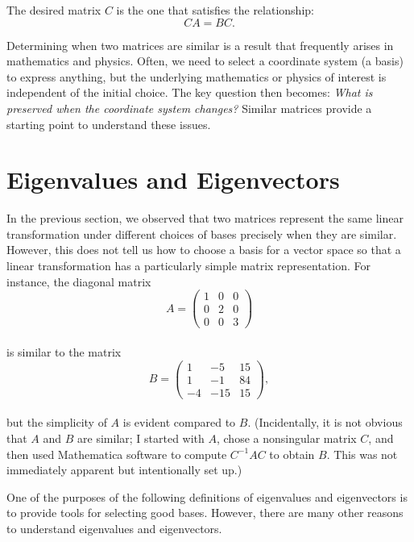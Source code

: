 \documentclass[
]{book}
\theoremstyle{definition}
\theoremstyle{definition}
\theoremstyle{definition}
\theoremstyle{definition}
\theoremstyle{remark}
\begin{document}
The desired matrix \(C\) is the one that satisfies the relationship:\\
\[
C A = B C.
\]

Determining when two matrices are similar is a result that frequently arises in mathematics and physics. Often, we need to select a coordinate system (a basis) to express anything, but the underlying mathematics or physics of interest is independent of the initial choice. The key question then becomes: \emph{What is preserved when the coordinate system changes?} Similar matrices provide a starting point to understand these issues.

\hypertarget{eigenvalues-and-eigenvectors}{%
\section{Eigenvalues and Eigenvectors}\label{eigenvalues-and-eigenvectors}}

In the previous section, we observed that two matrices represent the same linear transformation under different choices of bases precisely when they are similar. However, this does not tell us how to choose a basis for a vector space so that a linear transformation has a particularly simple matrix representation. For instance, the diagonal matrix\\
\[
A = 
\begin{pmatrix}
1 & 0 & 0 \\
0 & 2 & 0 \\
0 & 0 & 3
\end{pmatrix}
\]\\
is similar to the matrix\\
\[
B = 
\begin{pmatrix}
1 & -5 & 15 \\
1 & -1 & 84 \\
-4 & -15 & 15
\end{pmatrix},
\]\\
but the simplicity of \(A\) is evident compared to \(B\). (Incidentally, it is not obvious that \(A\) and \(B\) are similar; I started with \(A\), chose a nonsingular matrix \(C\), and then used Mathematica software to compute \(C^{-1}AC\) to obtain \(B\). This was not immediately apparent but intentionally set up.)

One of the purposes of the following definitions of eigenvalues and eigenvectors is to provide tools for selecting good bases. However, there are many other reasons to understand eigenvalues and eigenvectors.
\end{document}
